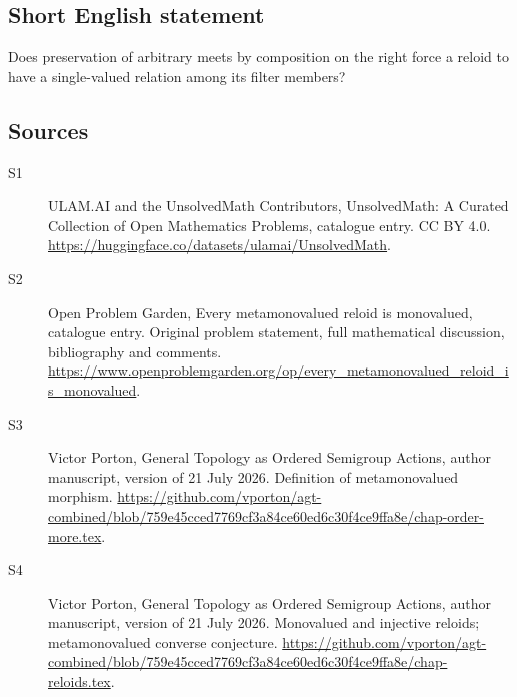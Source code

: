 \documentclass[11pt]{article}
\begin{document}
\subsection{Short English statement}
Does preservation of arbitrary meets by composition on the right force a reloid to have a single-valued relation among its filter members?
\subsection{Sources}
\begin{description}
\item[\hypertarget{source:statement:1}{S1}] ULAM.AI and the UnsolvedMath Contributors, UnsolvedMath: A Curated Collection of Open Mathematics Problems, catalogue entry. CC BY 4.0. \url{https://huggingface.co/datasets/ulamai/UnsolvedMath}.
\item[\hypertarget{source:statement:2}{S2}] Open Problem Garden, Every metamonovalued reloid is monovalued, catalogue entry. Original problem statement, full mathematical discussion, bibliography and comments. \url{https://www.openproblemgarden.org/op/every_metamonovalued_reloid_is_monovalued}.
\item[\hypertarget{source:statement:3}{S3}] Victor Porton, General Topology as Ordered Semigroup Actions, author manuscript, version of 21 July 2026. Definition of metamonovalued morphism. \url{https://github.com/vporton/agt-combined/blob/759e45cced7769cf3a84ce60ed6c30f4ce9ffa8e/chap-order-more.tex}.
\item[\hypertarget{source:statement:4}{S4}] Victor Porton, General Topology as Ordered Semigroup Actions, author manuscript, version of 21 July 2026. Monovalued and injective reloids; metamonovalued converse conjecture. \url{https://github.com/vporton/agt-combined/blob/759e45cced7769cf3a84ce60ed6c30f4ce9ffa8e/chap-reloids.tex}.
\end{description}
\label{end:statement}
\end{document}
